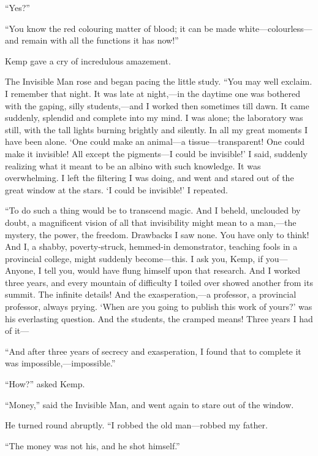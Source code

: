“Yes?”

“You know the red colouring matter of blood; it can be made white—colourless—and remain with all the functions it has now!”

Kemp gave a cry of incredulous amazement.

The Invisible Man rose and began pacing the little study. “You may well exclaim. I remember that night. It was late at night,—in the daytime one was bothered with the gaping, silly students,—and I worked then sometimes till dawn. It came suddenly, splendid and complete into my mind. I was alone; the laboratory was still, with the tall lights burning brightly and silently. In all my great moments I have been alone. ‘One could make an animal—a tissue—transparent! One could make it invisible! All except the pigments—I could be invisible!’ I said, suddenly realizing what it meant to be an albino with such knowledge. It was overwhelming. I left the filtering I was doing, and went and stared out of the great window at the stars. ‘I could be invisible!’ I repeated.

“To do such a thing would be to transcend magic. And I beheld, unclouded by doubt, a magnificent vision of all that invisibility might mean to a man,—the mystery, the power, the freedom. Drawbacks I saw none. You have only to think! And I, a shabby, poverty-struck, hemmed-in demonstrator, teaching fools in a provincial college, might suddenly become—this. I ask you, Kemp, if you— Anyone, I tell you, would have flung himself upon that research. And I worked three years, and every mountain of difficulty I toiled over showed another from its summit. The infinite details! And the exasperation,—a professor, a provincial professor, always prying. ‘When are you going to publish this work of yours?’ was his everlasting question. And the students, the cramped means! Three years I had of it—

“And after three years of secrecy and exasperation, I found that to complete it was impossible,—impossible.”

“How?” asked Kemp.

“Money,” said the Invisible Man, and went again to stare out of the window.

He turned round abruptly. “I robbed the old man—robbed my father.

“The money was not his, and he shot himself.”